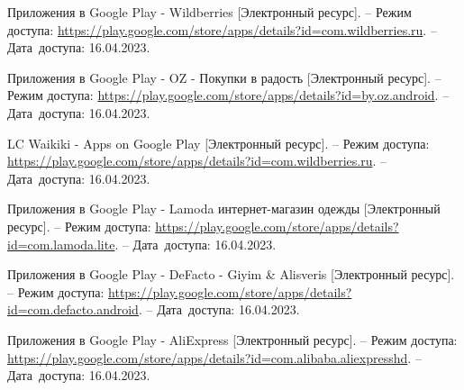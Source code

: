 \begingroup

  \renewcommand{\addcontentsline}[3]{}%
  \renewcommand{\section}[2]{}%

  \begin{thebibliography}{}

    Приложения в Google Play - Wildberries
    [Электронный ресурс].
    -- Режим доступа: \url{https://play.google.com/store/apps/details?id=com.wildberries.ru}.
    -- Дата~доступа: 16.04.2023.

    Приложения в Google Play - OZ - Покупки в радость
    [Электронный ресурс].
    -- Режим доступа: \url{https://play.google.com/store/apps/details?id=by.oz.android}.
    -- Дата~доступа: 16.04.2023.

    LC Waikiki - Apps on Google Play
    [Электронный ресурс].
    -- Режим доступа: \url{https://play.google.com/store/apps/details?id=com.wildberries.ru}.
    -- Дата~доступа: 16.04.2023.

    Приложения в Google Play - Lamoda интернет-магазин одежды
    [Электронный ресурс].
    -- Режим доступа: \url{https://play.google.com/store/apps/details?id=com.lamoda.lite}.
    -- Дата~доступа: 16.04.2023.

    Приложения в Google Play - DeFacto - Giyim \& Alisveris %
    [Электронный ресурс].
    -- Режим доступа: \url{https://play.google.com/store/apps/details?id=com.defacto.android}.
    -- Дата~доступа: 16.04.2023.

    Приложения в Google Play - AliExpress
    [Электронный ресурс].
    -- Режим доступа: \url{https://play.google.com/store/apps/details?id=com.alibaba.aliexpresshd}.
    -- Дата~доступа: 16.04.2023.


\end{thebibliography}
